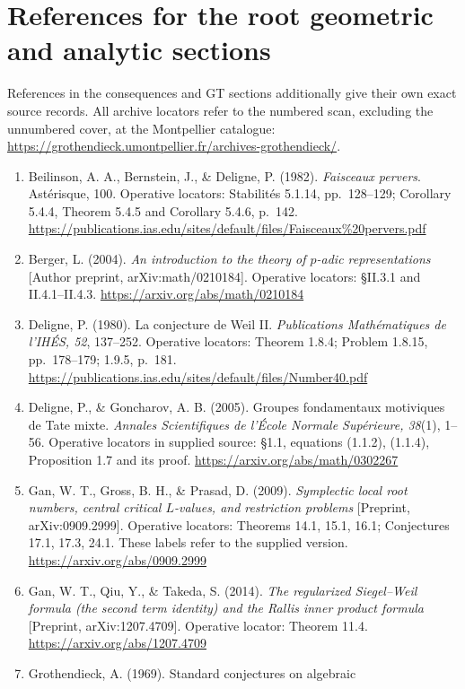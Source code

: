 \documentclass[11pt,a4paper]{article}
\theoremstyle{definition}\newtheorem{definition}[theorem]{Definition}
\theoremstyle{remark}\newtheorem{remark}[theorem]{Remark}
\begin{document}
\section{References for the root geometric and analytic sections}
References in the consequences and GT sections additionally give their
own exact source records. All archive locators refer to the numbered
scan, excluding the unnumbered cover, at the Montpellier catalogue:
\url{https://grothendieck.umontpellier.fr/archives-grothendieck/}.
\begin{enumerate}[leftmargin=0pt,labelsep=0pt,label={}]
\item Beilinson, A. A., Bernstein, J., \& Deligne, P. (1982).
\emph{Faisceaux pervers}. Ast\'erisque, 100. Operative locators:
Stabilit\'es 5.1.14, pp.~128--129; Corollary 5.4.4,
Theorem 5.4.5 and Corollary 5.4.6, p.~142.
\url{https://publications.ias.edu/sites/default/files/Faisceaux%20pervers.pdf}
\item Berger, L. (2004). \emph{An introduction to the theory of
$p$-adic representations} [Author preprint, arXiv:math/0210184].
Operative locators: \S II.3.1 and II.4.1--II.4.3.
\url{https://arxiv.org/abs/math/0210184}
\item Deligne, P. (1980). La conjecture de Weil II.
\emph{Publications Math\'ematiques de l'IH\'ES, 52}, 137--252.
Operative locators: Theorem 1.8.4; Problem 1.8.15,
pp.~178--179; 1.9.5, p.~181.
\url{https://publications.ias.edu/sites/default/files/Number40.pdf}
\item Deligne, P., \& Goncharov, A. B. (2005). Groupes fondamentaux
motiviques de Tate mixte. \emph{Annales Scientifiques de l'\'Ecole
Normale Sup\'erieure, 38}(1), 1--56.
Operative locators in supplied source: \S1.1, equations
(1.1.2), (1.1.4), Proposition 1.7 and its proof.
\url{https://arxiv.org/abs/math/0302267}
\item Gan, W. T., Gross, B. H., \& Prasad, D. (2009).
\emph{Symplectic local root numbers, central critical $L$-values,
and restriction problems} [Preprint, arXiv:0909.2999].
Operative locators: Theorems 14.1, 15.1, 16.1;
Conjectures 17.1, 17.3, 24.1. These labels refer to the supplied version.
\url{https://arxiv.org/abs/0909.2999}
\item Gan, W. T., Qiu, Y., \& Takeda, S. (2014).
\emph{The regularized Siegel--Weil formula (the second term identity)
and the Rallis inner product formula} [Preprint, arXiv:1207.4709].
Operative locator: Theorem 11.4.
\url{https://arxiv.org/abs/1207.4709}
\item Grothendieck, A. (1969). Standard conjectures on algebraic

\end{enumerate}
\end{document}
